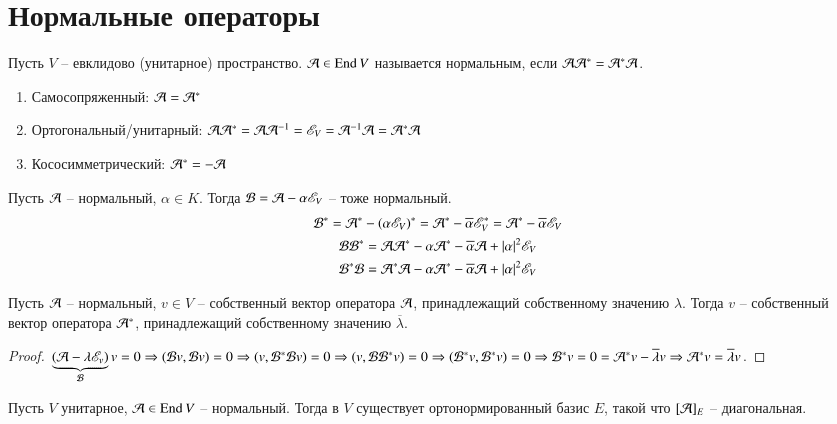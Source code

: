 \documentclass[main]{subfiles}
\begin{document}
\chapter{Нормальные операторы}

\begin{definition}
    Пусть $V$ -- евклидово (унитарное) пространство. $\mathcal{A} \in \operatorname{End} V$ называется нормальным, если
    $\mathcal{A} \mathcal{A}^* = \mathcal{A}^* \mathcal{A}$.
    \begin{enumerate}
        \item Самосопряженный: $\mathcal{A} = \mathcal{A}^*$
        \item Ортогональный/унитарный: $\mathcal{A} \mathcal{A}^* = \mathcal{A} \mathcal{A}^{-1} =\mathscr{E}_V = \mathcal{A}^{-1} \mathcal{A} = \mathcal{A}^* \mathcal{A}$
        \item Кососимметрический: $\mathcal{A}^* = -\mathcal{A}$
    \end{enumerate}
\end{definition}

\begin{proposition}
    Пусть $\mathcal{A}$ -- нормальный, $\alpha \in K$. Тогда $\mathcal{B} = \mathcal{A} - \alpha \mathscr{E}_V$ -- тоже нормальный.
    \begin{gather*}
        \mathcal{B}^* = \mathcal{A}^* - (\alpha \mathscr{E}_V)^* = \mathcal{A}^* - \overline{\alpha}\mathscr{E}_V^* = \mathcal{A}^* - \overline{\alpha}\mathscr{E}_V \\
        \mathcal{B} \mathcal{B}^* = \mathcal{A} \mathcal{A}^* - \alpha\mathcal{A}^* - \overline{\alpha}\mathcal{A} + |\alpha|^2\mathscr{E}_V \\
        \mathcal{B}^* \mathcal{B} = \mathcal{A}^* \mathcal{A} - \alpha \mathcal{A}^* - \overline{\alpha}\mathcal{A} + |\alpha|^2\mathscr{E}_V 
    \end{gather*}
\end{proposition}

\begin{proposition}
    Пусть $\mathcal{A}$ -- нормальный, $v \in V$ -- собственный вектор оператора $\mathcal{A}$, принадлежащий собственному значению $\lambda$. Тогда $v$ -- собственный вектор оператора $\mathcal{A}^*$, принадлежащий собственному значению $\overline{\lambda}$.
\end{proposition}

\begin{proof}
    $\underbrace{(\mathcal{A} - \lambda \mathscr{E}_v)}_{\mathcal{B}} v = 0 \Rightarrow (\mathcal{B} v, \mathcal{B} v) = 0 \Rightarrow
        (v, \mathcal{B}^* \mathcal{B} v) = 0 \Rightarrow (v, \mathcal{B} \mathcal{B}^* v) = 0 \Rightarrow (\mathcal{B}^* v, \mathcal{B}^* v) = 0 \Rightarrow \mathcal{B}^*v = 0 = \mathcal{A}^* v - \overline{\lambda}v \Rightarrow \mathcal{A}^*v = \overline{\lambda}v$.
\end{proof}

\begin{theorem} 
    Пусть $V$ унитарное, $\mathcal{A} \in \operatorname{End} V$ -- нормальный. Тогда в $V$ существует ортонормированный базис $E$, такой что $[\mathcal{A}]_E$ -- диагональная.
\end{theorem}
\end{document}

